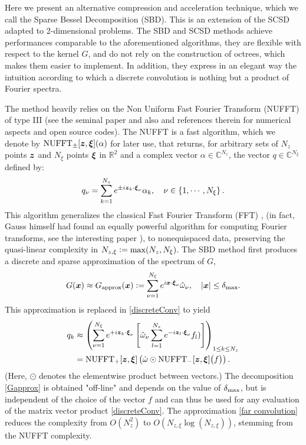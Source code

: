 \documentclass[smallextended]{svjour3}
\begin{document}
Here we present an alternative compression and acceleration technique, which we call the Sparse Bessel Decomposition (SBD). This is an extension of the SCSD adapted to 2-dimensional problems. The SBD and SCSD methods achieve performances comparable to the aforementioned algorithms, they are flexible with respect to the kernel $G$, and do not rely on the construction of octrees, which makes them easier to implement. In addition, they express in an elegant way the intuition according to which a discrete convolution is nothing but a product of Fourier spectra. 

The method heavily relies on the Non Uniform Fast Fourier Transform (NUFFT) of type III (see the seminal paper \cite{NuFFT} and also \cite{greengard2004accelerating,poplau2006calculation} and references therein for numerical aspects and open source codes).  The NUFFT is a fast algorithm, which we denote by $\operatorname{NUFFT}_\pm[\boldsymbol{z},\boldsymbol{\xi}](\alpha)$ for later use, that returns, for arbitrary sets of $N_z$ points $\boldsymbol{z}$ and $N_\xi$ points $\boldsymbol{\xi}$ in $\mathbb{R}^2$ and a complex vector $\alpha  \in \mathbb{C}^{N_z}$, the vector $q \in \mathbb{C}^{N_\xi}$ defined by:
\[ q_\nu = \sum_{k = 1}^{N_z} e^{\pm i \boldsymbol{z}_k \cdot \boldsymbol{\xi}_\nu} \alpha_k, \quad \nu \in \left\{1,\cdots,N_\xi \right\}.\]
This algorithm generalizes the classical Fast Fourier Transform (FFT) \cite{cooley1965algorithm}, (in fact, Gauss himself had found an equally powerful algorithm for computing Fourier transforms, see the interesting paper \cite{gaussFFT}), to nonequispaced data, preserving the quasi-linear complexity in $N_{z,\xi} \mathrel{\mathop:}= \max(N_z,N_\xi)$.
The SBD method first produces a discrete and sparse approximation of the spectrum of $G$,
\begin{equation}
	\label{Gapprox}
	G(\boldsymbol{x}) \approx G_{\text{approx}}(\boldsymbol{x}) \mathrel{\mathop:}= \sum_{\nu=1}^{N_\xi} e^{i  \boldsymbol{x}\cdot \boldsymbol{\xi}_\nu} \hat{\omega}_\nu, \quad \left\lvert \boldsymbol{x} \right\rvert \leq \delta_{\max}.
\end{equation}
This approximation is replaced in \eqref{discreteConv} to yield 
\begin{equation}
	\begin{split}	q_{k} &\approx \left(\sum_{\nu = 1}^{N_\xi} e^{+i  \boldsymbol{z}_k  \cdot\boldsymbol{\xi}_\nu } \left[\hat{\omega}_\nu \sum_{l=1}^{N_z} e^{- i \boldsymbol{z}_l \cdot \boldsymbol{\xi}_\nu} f_l) \right]\right)_{1 \leq k \leq N_z}\\
		&= \operatorname{NUFFT}_+[\boldsymbol{z},\boldsymbol{\xi}]\left(\hat{\omega} \odot \operatorname{NUFFT}_-[\boldsymbol{z},\boldsymbol{\xi}]\big(f\big)\right).
	\end{split}
	\label{far convolution}					
\end{equation}
(Here, $\odot$ denotes the elementwise product between vectors.) The decomposition \eqref{Gapprox} is obtained "off-line" and depends on the value of $\delta_{\max}$, but is independent of the choice of the vector $f$ and can thus be used for any evaluation of the matrix vector product \eqref{discreteConv}. 
The approximation \eqref{far convolution} reduces the complexity from $O(N_z^2)$ to $O(N_{z,\xi}\log (N_{z,\xi}))$, stemming from the NUFFT complexity.
\end{document}
